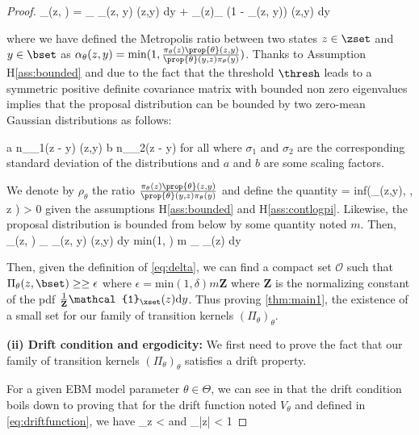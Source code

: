 \documentclass[10pt,twocolumn,letterpaper]{article}
\begin{document}
\begin{proof}
\beq 
\Pi_\theta(z, \bset) = \int_{\bset} \alpha_\theta(z, y) \prop{\theta}(z,y) \textrm{d}y + _{\bset(z)}\int_{\zset} (1 - \alpha_\theta(z, y)) \prop{\theta}(z,y) \textrm{d}y
\eeq

where we have defined the Metropolis ratio between two states $z \in \zset$ and $y \in \bset$ as $\alpha_\theta(z, y) = \textrm{min}(1, \frac{\pi_\theta(z)  \prop{\theta}(z,y)}{\prop{\theta}(y,z) \pi_\theta(y)  })$.
Thanks to Assumption H\ref{ass:bounded} and due to the fact that the threshold $\thresh$ leads to a symmetric positive definite covariance matrix with bounded non zero eigenvalues implies that the proposal distribution can be bounded by two zero-mean Gaussian distributions as follows:

\beq\label{eq:twogauss}
a n_{\sigma_1}(z - y) \leq \prop{\theta}(z,y)  \leq b n_{\sigma_2}(z - y) \quad \textrm{for all} \quad \theta \in \Theta
\eeq
where $\sigma_1$ and $\sigma_2$ are the corresponding standard deviation of the distributions and $a$ and $b$ are some scaling factors.

We denote by $\rho_\theta$ the ratio $\frac{\pi_\theta(z)  \prop{\theta}(z,y)}{\prop{\theta}(y,z) \pi_\theta(y)  }$ and define the quantity 
\beq\label{eq:delta}
\delta = \textrm{inf}(\rho_\theta(z,y), \theta \in \Theta, \quad z \in {} ) > 0
\eeq
 given the assumptions H\ref{ass:bounded} and H\ref{ass:contlogpi}.
Likewise, the proposal distribution is bounded from below by some quantity noted $m$.
Then,
\beq
\Pi_\theta(z, \bset) \geq  \int_{\bset \cap \xset} \alpha_\theta(z, y) \prop{\theta}(z,y) \textrm{d}y \geq \textrm{min}(1, \delta) m \int_{\bset} _\xset(z)  \textrm{d}y
\eeq

Then, given the definition of \eqref{eq:delta}, we can find a compact set $\mathcal{O}$ such that $\Pi_\theta(z, \bset) \geq \geq \epsilon$ where $\epsilon = \textrm{min}(1, \delta) m \textbf{Z}$ where $\textbf{Z}$ is the normalizing constant of the pdf $\frac{1}{\textbf{Z}}\mathcal{1}_\xset(z)  \textrm{d}y$.
Thus proving \eqref{thm:main1}, \ie the existence of a small set for our family of transition kernels $(\Pi_\theta)_\theta$.

\medskip
\noindent \textbf{(ii) Drift condition and ergodicity: }
We first need to prove the fact that our family of transition kernels $(\Pi_\theta)_\theta$ satisfies a drift property.

For a given EBM model parameter $\theta \in \Theta$, we can see in \cite{jarner2000geometric} that the drift condition boils down to proving that for the drift function noted $V_\theta$ and defined in \eqref{eq:driftfunction}, we have
\beq\label{mainproof}
\sup \limits_{z \in \zset}   < \infty \quad \textrm{and} \quad \lim \sup \limits_{|z| \to \infty}   < 1
\eeq


\end{proof}
\end{document}
